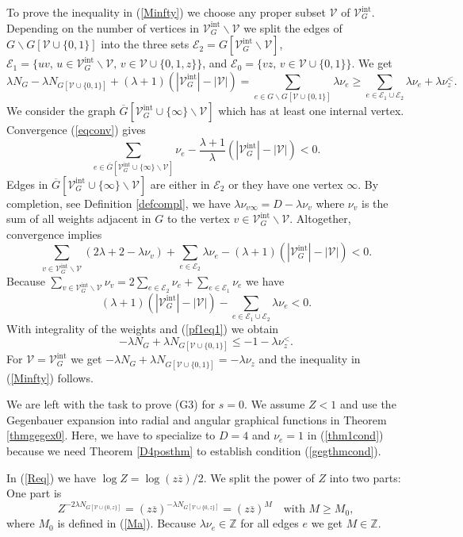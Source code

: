 \documentclass[oneside]{amsart}
\newcommand{\ZZ}{{\mathbb Z}}
\newcommand{\zz}{{\overline{z}}}
\newcommand{\Gg}{{\overline{G}}}
\newcommand{\sE}{\mathcal{E}}
\newcommand{\sV}{\mathcal{V}}
\newcommand{\sVGint}{{\sV_G^\mathrm{int}}}
\newcommand{\VGint}{{|\sVGint|}}
\theoremstyle{plain}
\begin{document}
To prove the inequality in (\ref{Minfty}) we choose any proper subset $\sV$ of $\sVGint$. Depending on the number of vertices in $\sVGint\backslash\sV$
we split the edges of $G\backslash G[\sV\cup\{0,1\}]$ into the three sets $\sE_2=G[\sVGint\backslash\sV]$, $\sE_1=\{uv,\,u\in\sVGint\backslash\sV,\,v\in\sV\cup\{0,1,z\}\}$,
and $\sE_0=\{vz,\,v\in\sV\cup\{0,1\}\}$. We get
\begin{equation}\label{pf1eq1}
\lambda N_G-\lambda N_{G[\sV\cup\{0,1\}]}+(\lambda+1)(\VGint-|\sV|)=\sum_{e\in G\backslash G[\sV\cup\{0,1\}]}\lambda\nu_e\geq\sum_{e\in\sE_1\cup\sE_2}\lambda\nu_e+\lambda\nu_z^<.
\end{equation}
We consider the graph $\Gg[\sVGint\cup\{\infty\}\backslash\sV]$ which has at least one internal vertex. Convergence (\ref{eqconv}) gives
$$
\sum_{e\in\Gg[\sVGint\cup\{\infty\}\backslash\sV]}\nu_e-\frac{\lambda+1}{\lambda}(\VGint-|\sV|)<0.
$$
Edges in $\Gg[\sVGint\cup\{\infty\}\backslash\sV]$ are either in $\sE_2$ or they have one vertex $\infty$. By completion, see Definition \ref{defcompl}, we have
$\lambda\nu_{v\infty}=D-\lambda\nu_v$ where $\nu_v$ is the sum of all weights adjacent in $G$ to the vertex $v\in\sVGint\backslash\sV$. Altogether, convergence implies
$$
\sum_{v\in\sVGint\backslash\sV}(2\lambda+2-\lambda\nu_v)+\sum_{e\in\sE_2}\lambda\nu_e-(\lambda+1)(\VGint-|\sV|)<0.
$$
Because $\sum_{v\in\sVGint\backslash\sV}\nu_v=2\sum_{e\in\sE_2}\nu_e+\sum_{e\in\sE_1}\nu_e$ we have
$$
(\lambda+1)(\VGint-|\sV|)-\sum_{e\in\sE_1\cup\sE_2}\lambda\nu_e<0.
$$
With integrality of the weights and (\ref{pf1eq1}) we obtain
$$
-\lambda N_G+\lambda N_{G[\sV\cup\{0,1\}]}\leq-1-\lambda\nu_z^<.
$$
For $\sV=\sVGint$ we get $-\lambda N_G+\lambda N_{G[\sV\cup\{0,1\}]}=-\lambda\nu_z$ and the inequality in (\ref{Minfty}) follows.

We are left with the task to prove (G3) for $s=0$. We assume $Z<1$ and use the Gegenbauer expansion into radial and angular graphical functions in Theorem \ref{thmgegex0}.
Here, we have to specialize to $D=4$ and $\nu_e=1$ in (\ref{thm1cond}) because we need Theorem \ref{D4posthm} to establish condition (\ref{gegthmcond}).

In (\ref{Req}) we have $\log Z=\log(z\zz)/2$. We split the power of $Z$ into two parts: One part is
$$
Z^{-2\lambda N_{G[\sV\cup\{0,z\}]}}=(z\zz)^{-\lambda N_{G[\sV\cup\{0,z\}]}}=(z\zz)^M\quad\text{with }M\geq M_0,
$$
where $M_0$ is defined in (\ref{Ma}). Because $\lambda\nu_e\in\ZZ$ for all edges $e$ we get $M\in\ZZ$.
\end{document}
